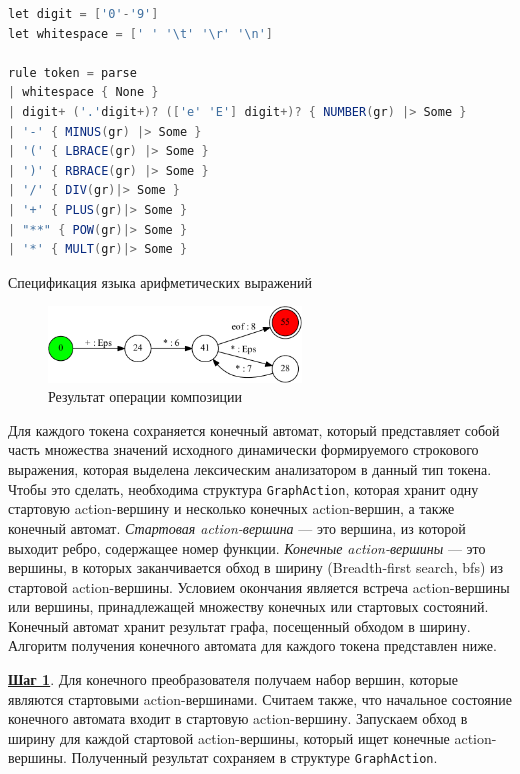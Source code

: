 \begin{listing}[H]
    \begin{lstlisting}[language=csharp,numbers=none]
let digit = ['0'-'9']
let whitespace = [' ' '\t' '\r' '\n']

rule token = parse
| whitespace { None }
| digit+ ('.'digit+)? (['e' 'E'] digit+)? { NUMBER(gr) |> Some }
| '-' { MINUS(gr) |> Some }
| '(' { LBRACE(gr) |> Some }
| ')' { RBRACE(gr) |> Some }
| '/' { DIV(gr)|> Some }
| '+' { PLUS(gr)|> Some }
| "**" { POW(gr)|> Some }
| '*' { MULT(gr)|> Some }
    \end{lstlisting}
\caption{Спецификация языка арифметических выражений}
\label{lst:calc}
\end{listing}

\begin{figure}[h!]
\begin{center}
\includegraphics[width=0.6\textwidth]{Polubelova/calc_ex_compose}
\caption{Результат операции композиции}
\label{fig:calc_ex_compose} 
\end{center}
\end{figure}
Для каждого токена сохраняется конечный автомат, который представляет собой часть множества значений исходного динамически формируемого строкового выражения, которая выделена лексическим анализатором в данный тип токена. Чтобы это сделать, необходима структура \verb|GraphAction|, которая хранит одну стартовую action-вершину и несколько конечных action-вершин, а также конечный автомат. \textit{Стартовая action-вершина} --- это вершина, из которой выходит ребро, содержащее номер функции. \textit{Конечные action-вершины} --- это вершины, в которых заканчивается обход в ширину (Breadth-first search, bfs) из стартовой action-вершины. Условием окончания является встреча action-вершины или вершины, принадлежащей множеству конечных или стартовых состояний. Конечный автомат хранит результат графа, посещенный обходом в ширину. Алгоритм получения конечного автомата для каждого токена представлен ниже.

\textbf{\underline{Шаг 1}}. Для конечного преобразователя получаем набор вершин, которые являются стартовыми action-вершинами. Считаем также, что начальное состояние конечного автомата входит в стартовую action-вершину. Запускаем обход в ширину для каждой стартовой action-вершины, который ищет конечные action-вершины. Полученный результат сохраняем в структуре \verb|GraphAction|.  

